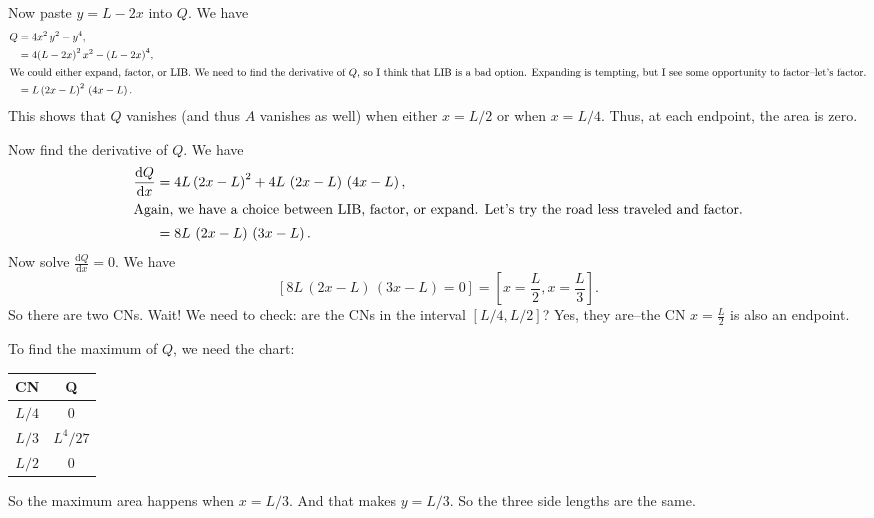 \documentclass[12pt,fleqn,answers]{exam}
\begin{document}
\begin{questions}
\begin{solution}
   \quad Now paste $y = L - 2 x$ into $Q$. We have
   \begin{align*}
      Q  &=4 {{x}^{2}}\, {{y}^{2}}-{{y}^{4}},\\
          &= 4 {{\left( L-2 x\right) }^{2}}\, {{x}^{2}}-{{\left( L-2 x\right) }^{4}}, \\
          \intertext{We could either expand, factor, or LIB. We need to find the
          derivative of $Q$, so I think that LIB is a bad option.
          Expanding is tempting, but I see some opportunity to factor--let's factor.}
          &= L\, {{\left( 2 x-L\right) }^{2}}\, \left( 4 x-L\right).       
   \end{align*}
   This shows that $Q$ vanishes (and thus $A$ vanishes as well) when
   either $x = L/2$ or when $x = L/4$. Thus, at each endpoint, the
   area is zero.

  \quad Now find the derivative of $Q$. We have
    \begin{align*}
      \frac{\mathrm{d} Q}{\mathrm{d} x}   &= 4 L\, {{\left( 2 x-L\right) }^{2}}+4 L\, \left( 2 x-L\right) \, \left( 4 x-L\right) ,\\
      \intertext{Again, we have a choice between LIB, factor, or expand. 
      Let's try the road less traveled and factor.}
                                                              &= 8 L\, \left( 2 x-L\right) \, \left( 3 x-L\right).
   \end{align*}   
   Now solve $\displaystyle \frac{\mathrm{d} Q}{\mathrm{d} x} = 0$. We have
   \begin{equation}
   \left[ 8 L\, \left( 2 x-L\right) \, \left( 3 x-L\right) = 0 \right] = \left[ x = \frac{L}{2}, x = \frac{L}{3} \right].
   \end{equation}
   So there are two CNs. Wait! We need to check: are the CNs in 
   the interval $[L/4, L/2]$? Yes, they are--the CN  $x = \frac{L}{2}$
   is also an endpoint.
   
   
  \quad To find the maximum of $Q$, we need the chart:
   \begin{center}
\begin{tabular}{|c|c|} \hline 
    CN & Q \\ \hline \hline
    $L/4$  & 0 \\
    $L/3$ & $L^{4}/27$ \\
    $L/2$ & 0 \\ \hline
\end{tabular}
\end{center}
So the maximum area happens when $x = L/3$. And that makes $y = L/3$.
So the three side lengths are the same.



\end{solution}
\end{questions}
\end{document}
